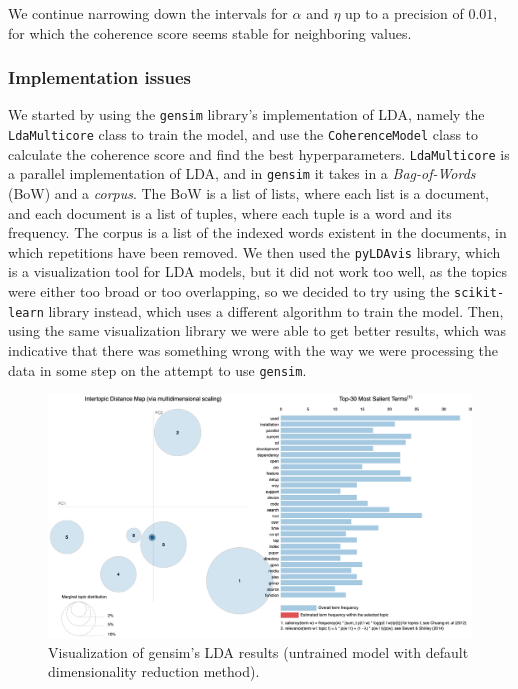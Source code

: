 \documentclass[11pt, conference, onecolumn, final]{IEEEtran}
\begin{document}
We continue narrowing down the intervals for $\alpha$ and $\eta$ up to a
precision of $0.01$, for which the coherence score seems stable for neighboring
values.

\subsubsection{Implementation issues} \label{sec:methodology:statistics-issues}

We started by using the \verb|gensim| library's implementation of LDA, namely
the \verb|LdaMulticore| class to train the model, and use the
\verb|CoherenceModel| class to calculate the coherence score and find the best
hyperparameters.
\verb|LdaMulticore| is a parallel implementation of LDA, and in \verb|gensim|
it takes in a \textit{Bag-of-Words} (BoW) and a \textit{corpus}.
The BoW is a list of lists, where each list is a document, and each document is
a list of tuples, where each tuple is a word and its frequency.
The corpus is a list of the indexed words existent in the documents, in which
repetitions have been removed.
We then used the \verb|pyLDAvis| library, which is a visualization tool for LDA
models, but it did not work too well, as the topics were either too broad or
too overlapping, so we decided to try using the \verb|scikit-learn| library
instead, which uses a different algorithm to train the model.
Then, using the same visualization library we were able to get better results,
which was indicative that there was something wrong with the way we were
processing the data in some step on the attempt to use \verb|gensim|.

\begin{figure}[H]
    \centering
    \includegraphics[width=\linewidth]{gensim-untrained.png}
    \caption{Visualization of gensim's LDA results (untrained model with
        default dimensionality reduction method).}
    \label{fig:lda_gensim_untrained}
\end{figure}
\end{document}
